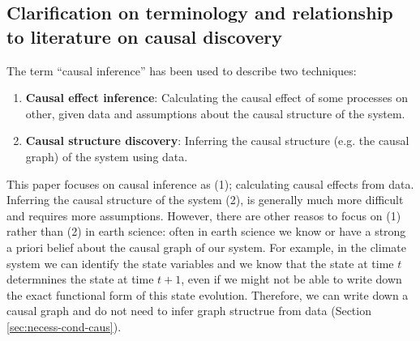 \documentclass[12pt]{article}
\begin{document}
\subsection{Clarification on terminology and relationship to literature on causal discovery}

The term ``causal inference'' has been used to describe two
techniques:

\begin{enumerate}
\item \textbf{Causal effect inference}: Calculating the causal effect
  of some processes on other, given data and assumptions about the
  causal structure of the system.
\item \textbf{Causal structure discovery}: Inferring the causal
  structure (e.g. the causal graph) of the system using data.
\end{enumerate}

This paper focuses on causal inference as (1); calculating causal
effects from data. Inferring the causal structure of the system (2),
is generally much more difficult and requires more
assumptions. However, there are other reasos to focus on (1) rather
than (2) in earth science: often in earth science we know or have a
strong a priori belief about the causal graph of our system. For
example, in the climate system we can identify the state variables and
we know that the state at time \(t\) determnines the state at time
\(t+1\), even if we might not be able to write down the exact
functional form of this state evolution. Therefore, we can write down
a causal graph and do not need to infer graph structrue from data
(Section \ref{sec:necess-cond-caus}).
\end{document}
